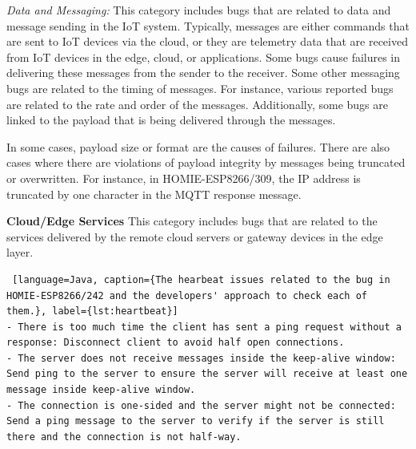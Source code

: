 \textit{Data and Messaging:}
This category includes bugs that are related to data and message sending in the IoT system. Typically, messages are either commands that are sent to IoT devices via the cloud, or they are telemetry data that are received from IoT devices in the edge, cloud, or applications. Some bugs cause failures in delivering these messages from the sender to the receiver. Some other messaging bugs are related to the timing of messages. For instance, various reported bugs are related to the rate and order of the messages. Additionally, some bugs are linked to the payload that is being delivered through the messages. 

In some cases, payload size or format are the causes of failures. There are also cases where there are violations of payload integrity by messages being truncated or overwritten. For instance, in HOMIE-ESP8266/309, the IP address is truncated by one character in the MQTT response message.


\textbf{Cloud/Edge Services}
This category includes bugs that are related to the services delivered by the remote cloud servers or gateway devices in the edge layer. 

\begin{lstlisting} [language=Java, caption={The hearbeat issues related to the bug in HOMIE-ESP8266/242 and the developers' approach to check each of them.}, label={lst:heartbeat}] 
- There is too much time the client has sent a ping request without a response: Disconnect client to avoid half open connections.
- The server does not receive messages inside the keep-alive window: Send ping to the server to ensure the server will receive at least one message inside keep-alive window.
- The connection is one-sided and the server might not be connected: Send a ping message to the server to verify if the server is still there and the connection is not half-way.
\end{lstlisting}

